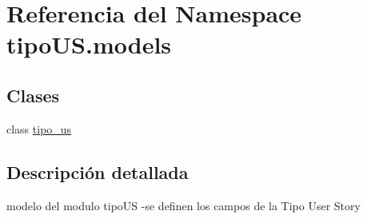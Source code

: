 \hypertarget{namespacetipo_u_s_1_1models}{}\section{Referencia del Namespace tipo\+U\+S.\+models}
\label{namespacetipo_u_s_1_1models}
\subsection*{Clases}
\begin{DoxyCompactItemize}
\item 
class \hyperlink{classtipo_u_s_1_1models_1_1tipo__us}{tipo\+\_\+us}
\end{DoxyCompactItemize}


\subsection{Descripción detallada}
\begin{DoxyVerb}modelo del modulo tipoUS
-se definen los campos de la Tipo User Story
\end{DoxyVerb}
 